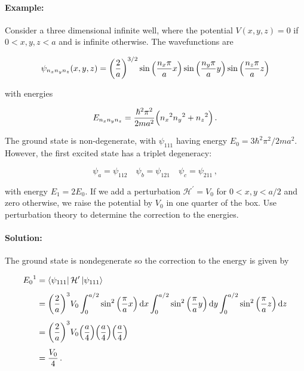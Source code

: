 \documentclass[12pt, titlepage]{article}
\begin{document}
\begin{mdframed}[backgroundcolor=gray!20]
\paragraph*{Example:}
Consider a three dimensional infinite well, where the potential ${V(x,y,z) = 0}$ if $0<x,y,z<a$ and is infinite otherwise. The wavefunctions are 

\begin{equation*}
	\psi_{n_{x}n_{y}n_{z}}(x,y,z) = \qty(\frac{2}{a})^{3/2}\sin\qty(\frac{n_x\pi}{a}x)\sin\qty(\frac{n_y\pi}{a}y)\sin\qty(\frac{n_z\pi}{a}z)
\end{equation*}

with energies

\begin{equation*}
	E_{n_{x}n_{y}n_{z}} = \frac{\hbar^2\pi^2}{2ma^2}\Bigl({n_x}^2  {n_y}^2 + {n_z}^2\Bigr) \,.
\end{equation*}

The ground state is non-degenerate, with $\psi_{111}$ having energy $E_0 = 3\hbar^2\pi^2/2ma^2$. However, the first excited state has a triplet degeneracy:

\begin{equation*}
	\psi_a = \psi_{112} \quad \psi_b = \psi_{121} \quad \psi_c = \psi_{211} \,,
\end{equation*}

with energy $E_{1} = 2E_0$. If we add a perturbation $\mathcal{H}^\prime = V_0$ for $0<x,y<a/2$ and zero otherwise, we raise the potential by $V_0$ in one quarter of the box. Use perturbation theory to determine the correction to the energies.

\paragraph*{Solution:}
The ground state is nondegenerate so the correction to the energy is given by

\begin{align*}
	{E_{0}}^1 &= \bra{\psi_{111}}\mathcal{H}^\prime\ket{\psi_{111}} \\[4pt]
	&= \qty(\frac{2}{a})^3V_0\int_{0}^{a/2}\sin^2\qty(\frac{\pi}{a}x)\dd{x}\int_{0}^{a/2}\sin^2\qty(\frac{\pi}{a}y)\dd{y}\int_{0}^{a/2}\sin^2\qty(\frac{\pi}{a}z)\dd{z} \\[4pt]
	&= \qty(\frac{2}{a})^3V_0\qty(\frac{a}{4})\qty(\frac{a}{4})\qty(\frac{a}{4}) \\[4pt]
	&= \frac{V_0}{4} \,.
\end{align*}


\end{mdframed}
\end{document}
